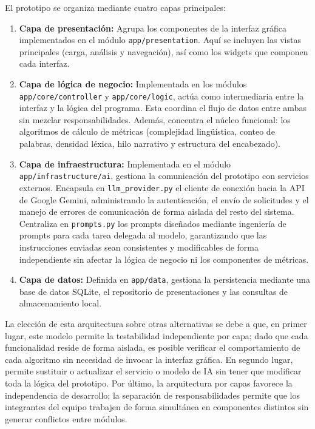 \documentclass[11pt]{article}
\begin{document}
El prototipo se organiza mediante cuatro capas principales:
\begingroup
\small
\RaggedRight
\begin{enumerate}
    \item \textbf{Capa de presentación:} Agrupa los componentes de la interfaz gráfica implementados en el módulo \texttt{app/presentation}. Aquí se incluyen las vistas principales (carga, análisis y navegación), así como los widgets que componen cada interfaz.
    \item \textbf{Capa de lógica de negocio:} Implementada en los módulos \texttt{app/core/controller} y \texttt{app/core/logic}, actúa como intermediaria entre la interfaz y la lógica del programa. Esta coordina el flujo de datos entre ambas sin mezclar responsabilidades. Además, concentra el núcleo funcional: los algoritmos de cálculo de métricas (complejidad lingüística, conteo de palabras, densidad léxica, hilo narrativo y estructura del encabezado).
    \item \textbf{Capa de infraestructura:} Implementada en el módulo \texttt{app/infrastructure/ai}, gestiona la comunicación del prototipo con servicios externos. Encapsula en \texttt{llm\_provider.py} el cliente de conexión hacia la API de Google Gemini, administrando la autenticación, el envío de solicitudes y el manejo de errores de comunicación de forma aislada del resto del sistema. Centraliza en \texttt{prompts.py} los prompts diseñados mediante ingeniería de prompts para cada tarea delegada al modelo, garantizando que las instrucciones enviadas sean consistentes y modificables de forma independiente sin afectar la lógica de negocio ni los componentes de métricas.
    \item \textbf{Capa de datos:} Definida en \texttt{app/data}, gestiona la persistencia mediante una base de datos SQLite, el repositorio de presentaciones y las consultas de almacenamiento local.
\end{enumerate}
\endgroup

La elección de esta arquitectura sobre otras alternativas se debe a que, en primer lugar, este modelo permite la testabilidad independiente por capa; dado que cada funcionalidad reside de forma aislada, es posible verificar el comportamiento de cada algoritmo sin necesidad de invocar la interfaz gráfica. En segundo lugar, permite sustituir o actualizar el servicio o modelo de IA sin tener que modificar toda la lógica del prototipo. Por último, la arquitectura por capas favorece la independencia de desarrollo; la separación de responsabilidades permite que los integrantes del equipo trabajen de forma simultánea en componentes distintos sin generar conflictos entre módulos.
\end{document}
